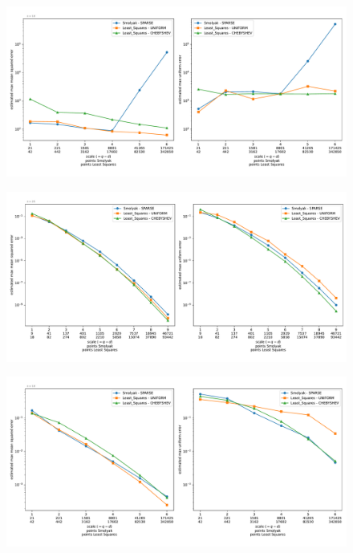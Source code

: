\documentclass[12pt, oneside]{amsart}
\theoremstyle{definition}
\theoremstyle{remark}
\numberwithin{equation}{section}
\begin{document}
\begin{figure}[h]
	\centering
	\includegraphics[width=\linewidth]{figures/discontinuous/dim10/max_error_distribution_fixed_dim}
	\caption{}
	\label{fig:discontinuous_dim10}
\end{figure}


\begin{figure}[h]
	\centering
	\includegraphics[width=\linewidth]{figures/gaussian/dim4/max_error_distribution_fixed_dim}
	\caption{}
	\label{fig:gaussian_dim4}
\end{figure}

\begin{figure}[h]
	\centering
	\includegraphics[width=\linewidth]{figures/gaussian/dim10/max_error_distribution_fixed_dim}
	\caption{}
	\label{fig:gaussian_dim10}
\end{figure}
\end{document}

